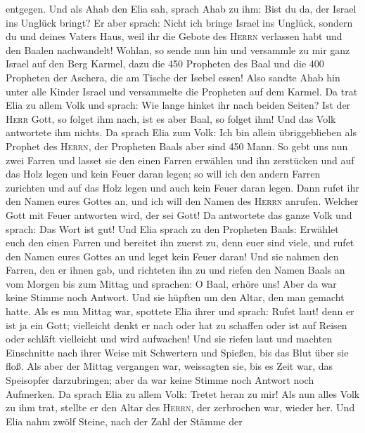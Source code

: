 entgegen.  Und als Ahab den Elia sah, sprach Ahab zu ihm:
Bist du da, der Israel ins Unglück bringt?  Er aber
sprach: Nicht ich bringe Israel ins Unglück, sondern du und deines
Vaters Haus, weil ihr die Gebote des \textsc{Herrn} verlassen habt und
den Baalen nachwandelt!  Wohlan, so sende nun hin und
versammle zu mir ganz Israel auf den Berg Karmel, dazu die 450 Propheten
des Baal und die 400 Propheten der Aschera, die am Tische der Isebel
essen!  Also sandte Ahab hin unter alle Kinder Israel und
versammelte die Propheten auf dem Karmel.  Da trat Elia
zu allem Volk und sprach: Wie lange hinket ihr nach beiden Seiten? Ist
der \textsc{Herr} Gott, so folget ihm nach, ist es aber Baal, so folget
ihm! Und das Volk antwortete ihm nichts.  Da sprach Elia
zum Volk: Ich bin allein übriggeblieben als Prophet des \textsc{Herrn},
der Propheten Baals aber sind 450 Mann.  So gebt uns nun
zwei Farren und lasset sie den einen Farren erwählen und ihn zerstücken
und auf das Holz legen und kein Feuer daran legen; so will ich den
andern Farren zurichten und auf das Holz legen und auch kein Feuer daran
legen.  Dann rufet ihr den Namen eures Gottes an, und ich
will den Namen des \textsc{Herrn} anrufen. Welcher Gott mit Feuer
antworten wird, der sei Gott! Da antwortete das ganze Volk und sprach:
Das Wort ist gut!  Und Elia sprach zu den Propheten
Baals: Erwählet euch den einen Farren und bereitet ihn zuerst zu, denn
euer sind viele, und rufet den Namen eures Gottes an und leget kein
Feuer daran!  Und sie nahmen den Farren, den er ihnen
gab, und richteten ihn zu und riefen den Namen Baals an vom Morgen bis
zum Mittag und sprachen: O Baal, erhöre uns! Aber da war keine Stimme
noch Antwort. Und sie hüpften um den Altar, den man gemacht hatte.
 Als es nun Mittag war, spottete Elia ihrer und sprach:
Rufet laut! denn er ist ja ein Gott; vielleicht denkt er nach oder hat
zu schaffen oder ist auf Reisen oder schläft vielleicht und wird
aufwachen!  Und sie riefen laut und machten Einschnitte
nach ihrer Weise mit Schwertern und Spießen, bis das Blut über sie floß.
 Als aber der Mittag vergangen war, weissagten sie, bis
es Zeit war, das Speisopfer darzubringen; aber da war keine Stimme noch
Antwort noch Aufmerken.  Da sprach Elia zu allem Volk:
Tretet heran zu mir! Als nun alles Volk zu ihm trat, stellte er den
Altar des \textsc{Herrn}, der zerbrochen war, wieder her.
 Und Elia nahm zwölf Steine, nach der Zahl der Stämme der
